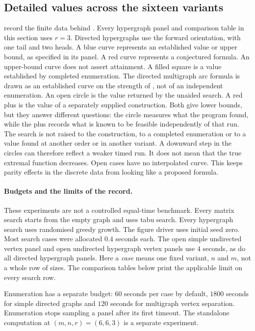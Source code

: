 \subsection{Detailed values across the sixteen variants}\label{sec:variant-grids}

 record the finite data behind .
Every hypergraph panel and comparison table in this section uses $r=3$.
Directed hypergraphs use the forward orientation, with one tail and two heads.
A blue curve represents an established value or upper bound, as specified in its panel. A red curve represents a conjectured formula. An upper-bound curve does not assert attainment.
A filled square is a value established by completed enumeration. The directed multigraph arc formula is drawn as an established curve on the strength of , not of an independent enumeration.
An open circle is the value returned by the unaided search.
A red plus is the value of a separately supplied construction.
Both give lower bounds, but they answer different questions: the circle measures
what the program found, while the plus records what is known to be feasible
independently of that run. The search is not raised to the construction,
to a completed enumeration or to a value found at another order or in another
variant. A downward step in the circles can therefore reflect a weaker timed
run. It does not mean that the true extremal function decreases.
Open cases have no interpolated curve.
This keeps parity effects in the discrete data from looking like a proposed formula.

\paragraph{Budgets and the limits of the record.}
These experiments are not a controlled equal-time benchmark.
Every matrix search starts from the empty graph and uses tabu search.
Every hypergraph search uses randomised greedy growth. The figure driver uses
initial seed zero. Most search cases were allocated $0.4$ seconds each.
The open simple undirected vertex panel and open undirected hypergraph vertex
panels use $4$ seconds, as do all directed hypergraph panels.
Here a \emph{case} means one fixed variant, $n$ and $m$, not a whole row of sizes.
The comparison tables below print the applicable limit on every search row.

Enumeration has a separate budget: $60$ seconds per case by default,
$1800$ seconds for simple directed graphs and $120$ seconds for multigraph
vertex separation. Enumeration stops sampling a panel after its first timeout.
The standalone computation at $(m,n,r)=(6,6,3)$ is a separate experiment.

